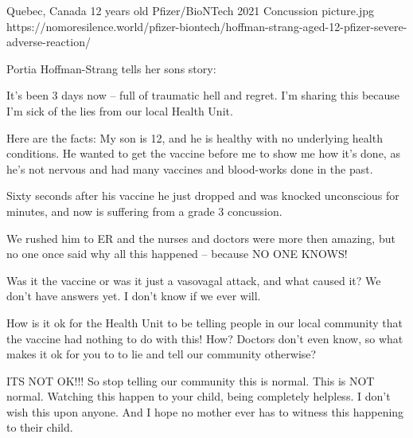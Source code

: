 {Quebec, Canada}
{12 years old}
{Pfizer/BioNTech}
{2021}
{Concussion}
{picture.jpg}
{https://nomoresilence.world/pfizer-biontech/hoffman-strang-aged-12-pfizer-severe-adverse-reaction/}
{

Portia Hoffman-Strang tells her sons story:

It’s been 3 days now – full of traumatic hell and regret. I’m sharing this
because I’m sick of the lies from our local Health Unit.

Here are the facts: My son is 12, and he is healthy with no underlying health
conditions. He wanted to get the vaccine before me to show me how it’s done, as
he’s not nervous and had many vaccines and blood-works done in the past.

Sixty seconds after his vaccine he just dropped and was knocked unconscious for
minutes, and now is suffering from a grade 3 concussion.

We rushed him to ER and the nurses and doctors were more then amazing, but no
one once said why all this happened – because NO ONE KNOWS!

Was it the vaccine or was it just a vasovagal attack, and what caused it? We
don’t have answers yet. I don’t know if we ever will.

How is it ok for the Health Unit to be telling people in our local community
that the vaccine had nothing to do with this! How? Doctors don’t even know, so
what makes it ok for you to to lie and tell our community otherwise?

ITS NOT OK!!! So stop telling our community this is normal. This is NOT
normal. Watching this happen to your child, being completely helpless. I don’t
wish this upon anyone. And I hope no mother ever has to witness this happening
to their child.

}
